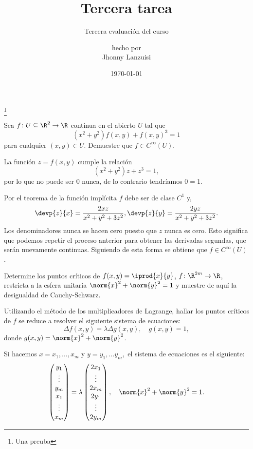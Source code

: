 \documentclass{scrartcl}
\begin{document}
%
\title{Tercera tarea}
\subtitle{Tercera evaluación del curso}
\subject{Análisis III}
\titlehead{Universidad Simón Bolívar\hfill Caracas, Venezuela}
\author{{\normalsize hecho por} \\ Jhonny Lanzuisi}
\date{\today}
\maketitle
\thanks{Una preuba}

\exercise
%
Sea \(f\colon U\subseteq\R^{2}\to\R\) continua en el abierto \(U\)
tal que
\[
(x^2+y^2)f(x,y) + f(x,y)^3 = 1
\]
para cualquier \((x,y)\in U\). Demuestre que \(f\in C^\infty (U)\).

\solution
%
La función \(z = f(x,y)\) cumple la relación
\[
(x^2+y^2)z + z^3 = 1,
\]
por lo que no puede ser 0 nunca, de lo contrario tendríamos
\(0=1\).

Por el teorema de la función implícita \(f\) debe ser
de clase \(C^1\) y,
\[
\devp{z}{x} = \frac{2xz}{x^2+y^2+3z^2},
\devp{z}{y} = \frac{2yz}{x^2+y^2+3z^2}.
\]
Los denominadores nunca se hacen cero puesto que
\(z\) nunca es cero. Esto significa que podemos
repetir el proceso anterior para obtener las derivadas segundas,
que serán nuevamente continuas. Siguiendo de esta forma se obtiene
que \(f\in C^\infty(U)\).

\exercise
%
Determine los puntos críticos de \(f(x,y) = \iprod{x}{y}\),
\(f\colon\R^{2m}\to\R\), restricta a la esfera unitaria
\(\norm{x}^2+\norm{y}^2 = 1\) y muestre de aquí la desigualdad
de Cauchy-Schwarz.

\solution
%
Utilizando el método de los multiplicadores de Lagrange,
hallar los puntos críticos de \(f\) se reduce a resolver
el siguiente sistema de ecuaciones:
\[
\Delta f(x,y) = \lambda\Delta g(x,y), \quad g(x,y) = 1,
\]
donde \(g(x,y) = \norm{x}^2 + \norm{y}^2\).

Si hacemos \(x = x_1,\dots, x_m\) y \(y = y_1,\dots y_m,\)
el sistema de ecuaciones es el siguiente:
\[
\begin{pmatrix}
    y_1 \\ \vdots \\ y_m \\ x_1 \\ \vdots \\ x_m
\end{pmatrix}
= \lambda
\begin{pmatrix}
    2x_1 \\ \vdots \\ 2x_m \\ 2y_1 \\ \vdots \\ 2y_m
\end{pmatrix}
, \quad
\norm{x}^2+\norm{y}^2 = 1.
\]
\end{document}
